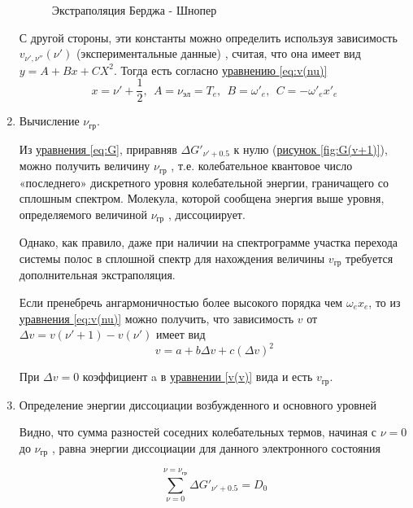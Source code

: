 \documentclass{article}
\begin{document}
\begin{enumerate}
\begin{figure}[h]
\begin{center}
\begin{minipage}[h]{0.4\linewidth}
\caption{Экстраполяция Берджа - Шнопер}
  \label{fig:berdj-shnoper}
\end{minipage}
\end{center}
\end{figure}

С другой стороны, эти константы можно определить используя зависимость $v_{\nu', \nu''} (\nu')$ (экспериментальные данные) , считая, что она имеет вид $y = A + Bx + CX^2$. Тогда есть согласно \hyperref[eq:v(nu)]{уравнению \ref*{eq:v(nu)}}
\begin{equation}
\label{const}
    x = \nu' + \frac{1}{2},~~A = \nu_{эл} = T_e, ~~B = \omega'_e, ~~ C = -\omega'_e x'_e
\end{equation} 
\item Вычисление $\nu_{гр}$. 

Из \hyperref[eq:G]{уравнения \ref*{eq:G}}, приравняв  $\Delta G'_{\nu'+0.5}$ к нулю (\hyperref[fig:G(v+1)]{рисунок \ref*{fig:G(v+1)}}), можно получить величину $\nu_{гр}$ , т.е. колебательное квантовое число «последнего» дискретного уровня колебательной энергии, граничащего со
сплошным спектром. Молекула, которой сообщена энергия выше
уровня, определяемого величиной $\nu_{гр}$ , диссоциирует. 

Однако, как правило,
даже при наличии на спектрограмме участка перехода системы полос в сплошной спектр для нахождения величины $v_{гр}$ требуется дополнительная экстраполяция. 

Если пренебречь ангармоничностью более высокого порядка чем $\omega_e x_e$, то из \hyperref[eq:v(nu)]{уравнения \ref*{eq:v(nu)}} можно получить, что зависимость $v$ от $\Delta v = v(\nu'+1)- v(\nu')$ имеет вид
\begin{equation}
\label{v(v)}
    v = a + b\Delta v + c(\Delta v)^2
\end{equation}

При $\Delta v = 0$ коэффициент a в  \hyperref[v(v)]{уравнении \ref*{v(v)}}  вида и есть $v_{гр}$.

\item Определение энергии диссоциации возбужденного и основного уровней

Видно, что сумма разностей соседних колебательных термов, начиная с $\nu = 0$ до $\nu_{гр}$ , равна энергии диссоциации для данного электронного состояния

\begin{equation}
\label{D0 berdj shnop}
    \sum_{\nu = 0}^{\nu = \nu_{гр}} \Delta G'_{\nu'+0.5} = D_0
\end{equation}


\end{enumerate}
\end{document}
